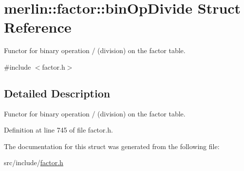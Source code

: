\hypertarget{structmerlin_1_1factor_1_1binOpDivide}{}\section{merlin\+:\+:factor\+:\+:bin\+Op\+Divide Struct Reference}
\label{structmerlin_1_1factor_1_1binOpDivide}


Functor for binary operation / (division) on the factor table.  




{\ttfamily \#include $<$factor.\+h$>$}



\subsection{Detailed Description}
Functor for binary operation / (division) on the factor table. 

Definition at line 745 of file factor.\+h.



The documentation for this struct was generated from the following file\+:\begin{DoxyCompactItemize}
\item 
src/include/\hyperlink{factor_8h}{factor.\+h}\end{DoxyCompactItemize}
